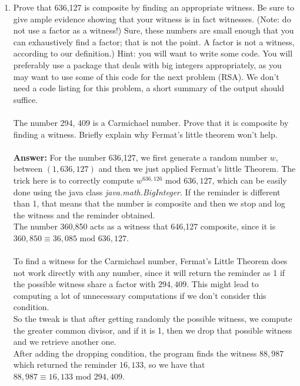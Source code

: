 \documentclass[tikz, 12pt]{scrartcl}
\begin{document}
\begin{enumerate}
	\item Prove that 636,127 is composite by finding an appropriate witness. Be sure to give ample evidence showing that your witness is in fact witnesses. (Note: do not use a factor as a witness!) Sure, these numbers are small enough that you can exhaustively find a factor; that is not the point. A factor is not a witness, according to our definition.) Hint: you will want to write some code. You will preferably use a package that deals with big integers appropriately, as you may want to use some of this code for the next problem (RSA). We don't need a code listing for this problem, a short summary of the output should suffice.\\
	\\
	The number 294, 409 is a Carmichael number. Prove that it is composite by finding a witness. Briefly explain why Fermat's little theorem won't help. \\
	\\
	\textbf{Answer:}  For the number 636,127, we first generate a random number $w$, between $(1, 636,127)$ and then we just applied Fermat's little Theorem. The trick here is to correctly compute $w^{636,126} \mbox{ mod } 636,127$, which can be easily done using the java class \textit{java.math.BigInteger}. If the reminder is different than 1, that means that the number is composite and then we stop and log the witness and the reminder obtained. \\
	The number 360,850 acts as a witness that 646,127 composite, since it is $360,850 \equiv 36,085 \mbox{ mod } 636,127$.\\
	\\
	To find a witness for the Carmichael number, Fermat's Little Theorem does not work directly with any number, since it will return the reminder as 1 if the possible witness share a factor with $294,409$. This might lead to computing a lot of unnecessary computations if we don't consider this condition. \\
	So the tweak is that after getting randomly the possible witness, we compute the greater common divisor, and if it is 1, then we drop that possible witness and we retrieve another one. \\
	After adding the dropping condition, the program finds the witness $88,987$ which returned the reminder $16,133$, so we have that $88,987 \equiv 16,133 \mbox{ mod }294,409$.
	

\end{enumerate}
\end{document}
